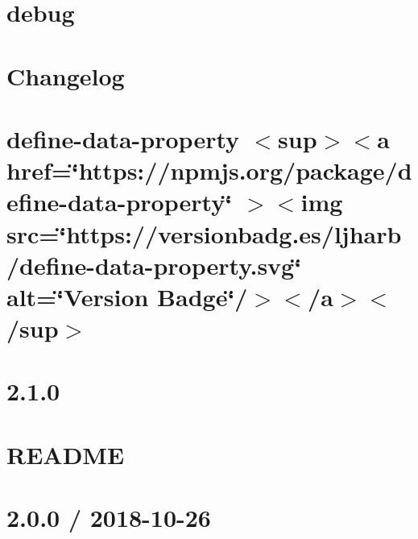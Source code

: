 \documentclass[twoside]{book}
\newcommand{\+}{\discretionary{\mbox{\scriptsize$\hookleftarrow$}}{}{}}
\begin{document}
\chapter{debug}
\label{md_Backend_nodejs_node_modules_debug_README}

\chapter{Changelog}
\label{md_Backend_nodejs_node_modules_define_data_property_CHANGELOG}

\chapter{define-\/data-\/property \texorpdfstring{$<$}{<}sup\texorpdfstring{$>$}{>}\texorpdfstring{$<$}{<}a href=\char`\"{}https\+://npmjs.\+org/package/define-\/data-\/property\char`\"{} \texorpdfstring{$>$}{>}\texorpdfstring{$<$}{<}img src=\char`\"{}https\+://versionbadg.\+es/ljharb/define-\/data-\/property.\+svg\char`\"{} alt=\char`\"{}\+Version Badge\char`\"{}/\texorpdfstring{$>$}{>}\texorpdfstring{$<$}{<}/a\texorpdfstring{$>$}{>}\texorpdfstring{$<$}{<}/sup\texorpdfstring{$>$}{>}}
\label{md_Backend_nodejs_node_modules_define_data_property_README}

\chapter{2.1.0}
\label{md_Backend_nodejs_node_modules_denque_CHANGELOG}

\chapter{README}
\label{md_Backend_nodejs_node_modules_denque_README}

\chapter{2.0.0 / 2018-\/10-\/26}
\label{md_Backend_nodejs_node_modules_depd_History}

\end{document}
